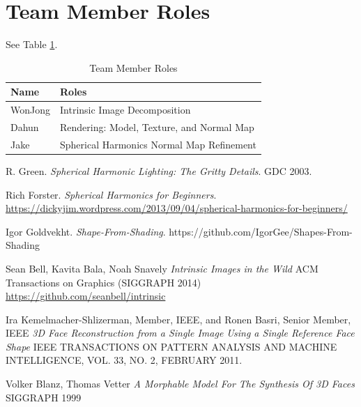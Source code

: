 \documentclass[10pt,twocolumn,letterpaper]{article}
\begin{document}
\section{Team Member Roles}
See Table \ref{tab:roles}.
\begin{table}[!h]
	\begin{tabular}{l|l}
		\textbf{Name} & Roles \\
		\hline
		WonJong & Intrinsic Image Decomposition \\
		Dahun & Rendering: Model, Texture, and Normal Map \\
		Jake & Spherical Harmonics Normal Map Refinement \\
		\hline
	\end{tabular}
	\caption{Team Member Roles}
	\label{tab:roles}
\end{table}

\begin{thebibliography}{1}
	R. Green.
	\textit{Spherical Harmonic Lighting: The Gritty Details}. 
	GDC 2003.
	
	Rich Forster.
	\textit{Spherical Harmonics for Beginners}. 
	\url{https://dickyjim.wordpress.com/2013/09/04/spherical-harmonics-for-beginners/}

	Igor Goldvekht. 
	\textit{Shape-From-Shading}. 
	https://github.com/IgorGee/Shapes-From-Shading
    
    Sean Bell, Kavita Bala, Noah Snavely
    \textit{Intrinsic Images in the Wild}
     ACM Transactions on Graphics (SIGGRAPH 2014)
     \url{https://github.com/seanbell/intrinsic}
    
    Ira Kemelmacher-Shlizerman, Member, IEEE, and Ronen Basri, Senior Member, IEEE \textit{3D Face Reconstruction from a Single Image Using a Single Reference Face Shape}
    IEEE TRANSACTIONS ON PATTERN ANALYSIS AND MACHINE INTELLIGENCE, VOL. 33, NO. 2, FEBRUARY 2011.
    
    Volker Blanz, Thomas Vetter
    \textit{A Morphable Model For The Synthesis Of 3D Faces}
    SIGGRAPH 1999
    
\end{thebibliography}
\end{document}
